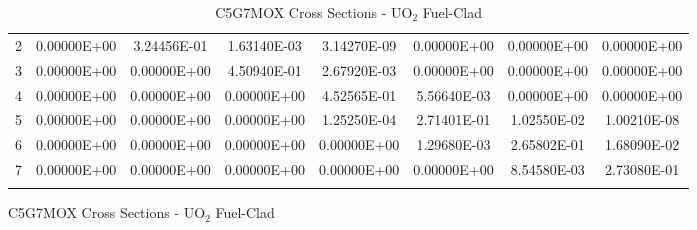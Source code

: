 \begin{figure}
\begin{table}[H]
\begin{subtable}[h]{1.0\textwidth}
{\begin{tabular}{*8c}
2 & 0.00000E+00 & 3.24456E-01 & 1.63140E-03 & 3.14270E-09 & 0.00000E+00 & 0.00000E+00 & 0.00000E+00 \\
3 & 0.00000E+00 & 0.00000E+00 & 4.50940E-01 & 2.67920E-03 & 0.00000E+00 & 0.00000E+00 & 0.00000E+00 \\
4 & 0.00000E+00 & 0.00000E+00 & 0.00000E+00 & 4.52565E-01 & 5.56640E-03 & 0.00000E+00 & 0.00000E+00 \\
5 & 0.00000E+00 & 0.00000E+00 & 0.00000E+00 & 1.25250E-04 & 2.71401E-01 & 1.02550E-02 & 1.00210E-08 \\
6 & 0.00000E+00 & 0.00000E+00 & 0.00000E+00 & 0.00000E+00 & 1.29680E-03 & 2.65802E-01 & 1.68090E-02 \\
7 & 0.00000E+00 & 0.00000E+00 & 0.00000E+00 & 0.00000E+00 & 0.00000E+00 & 8.54580E-03 & 2.73080E-01 \\
        \bottomrule
        & & & & & & & 
    \end{tabular}}
  \end{subtable}
    \caption{C5G7MOX Cross Sections - UO$_{2}$ Fuel-Clad}
\end{table}
\end{figure}


